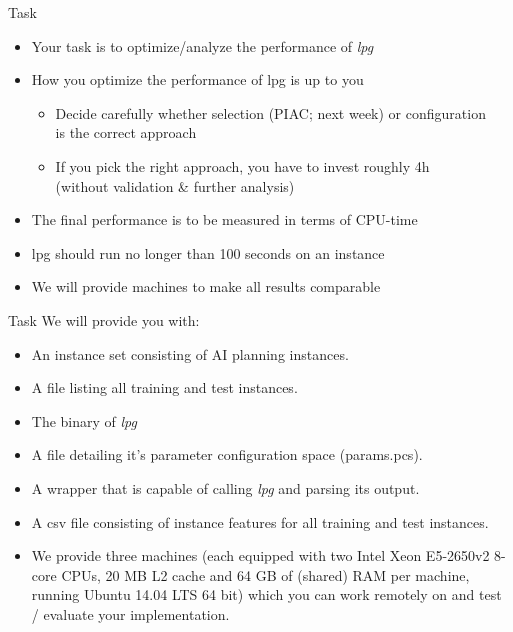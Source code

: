 \begin{frame}[c]{Task}
\begin{itemize}
    \item Your task is to optimize/analyze the performance of \textit{lpg}
    \pause
    \item How you optimize the performance of lpg is up to you
    \pause
    \begin{itemize}
     	\item Decide carefully whether selection (PIAC; next week) or configuration\\ is the correct approach
     	\item If you pick the right approach, you have to invest roughly 4h\\ (without validation \& further analysis) 
    \end{itemize}
    \pause
    \item The final performance is to be measured in terms of CPU-time
    \item lpg should run no longer than 100 seconds on an instance
    \pause
    \item We will provide machines to make all results comparable
\end{itemize}
\end{frame}
\begin{frame}[c]{Task}
We will provide you with:\\
\begin{itemize}
    \item An instance set consisting of AI planning instances.
    \pause
    \item A file listing all training and test instances.
    \pause
    \item The binary of \textit{lpg}
    \item A file detailing it's parameter configuration space (params.pcs).
    \pause
    \item A wrapper that is capable of calling \textit{lpg} and parsing its output.
    \pause
    \item A csv file consisting of instance features for all training and test instances.
    \pause
    \item We provide three machines (each equipped with two Intel Xeon E5-2650v2 8-core CPUs, 20 MB L2 cache and 64 GB of (shared) RAM per machine, running Ubuntu 14.04 LTS 64 bit) which you can work remotely on and test / evaluate your implementation.
\end{itemize}
\end{frame}
